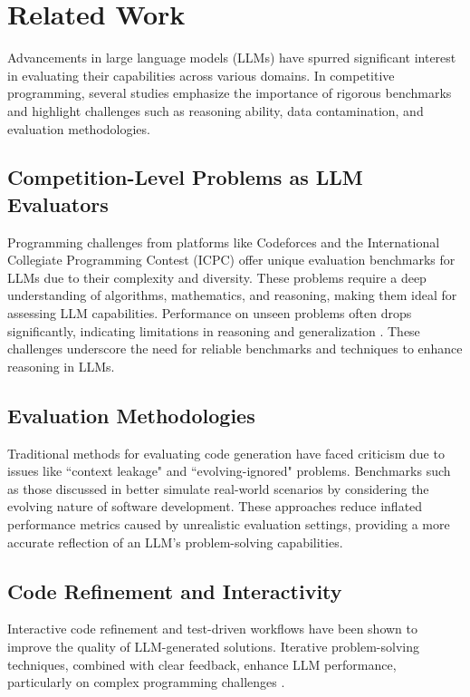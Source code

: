 \section{Related Work}
Advancements in large language models (LLMs) have spurred significant interest in evaluating their capabilities across various domains. In competitive programming, several studies emphasize the importance of rigorous benchmarks and highlight challenges such as reasoning ability, data contamination, and evaluation methodologies.

\subsection{Competition-Level Problems as LLM Evaluators}
Programming challenges from platforms like Codeforces and the International Collegiate Programming Contest (ICPC) offer unique evaluation benchmarks for LLMs due to their complexity and diversity. These problems require a deep understanding of algorithms, mathematics, and reasoning, making them ideal for assessing LLM capabilities. Performance on unseen problems often drops significantly, indicating limitations in reasoning and generalization \cite{b1,b12}. These challenges underscore the need for reliable benchmarks and techniques to enhance reasoning in LLMs.

\subsection{Evaluation Methodologies}
Traditional methods for evaluating code generation have faced criticism due to issues like ``context leakage" and ``evolving-ignored" problems. Benchmarks such as those discussed in \cite{b2} better simulate real-world scenarios by considering the evolving nature of software development. These approaches reduce inflated performance metrics caused by unrealistic evaluation settings, providing a more accurate reflection of an LLM's problem-solving capabilities.

\subsection{Code Refinement and Interactivity}
Interactive code refinement and test-driven workflows have been shown to improve the quality of LLM-generated solutions. Iterative problem-solving techniques, combined with clear feedback, enhance LLM performance, particularly on complex programming challenges \cite{b3,b13}.

